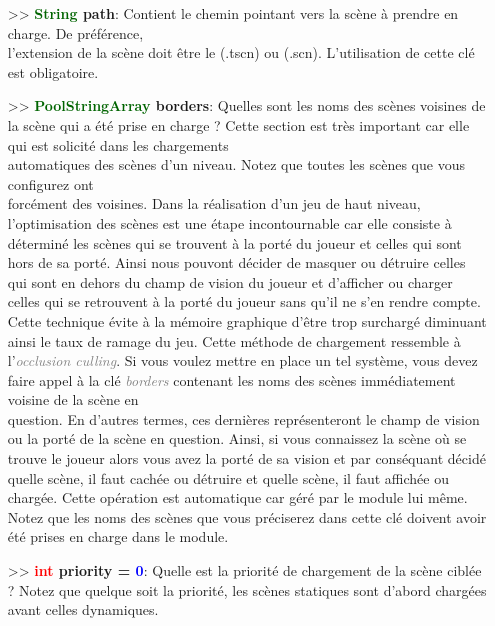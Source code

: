 \documentclass[a4paper, 11pt]{article}
\begin{document}
	\begin{itemize}
		\item[>> \textbf{\textcolor{darkgreen}{String} path}:] Contient le chemin pointant vers la scène à 
		prendre en charge. De préférence, \\l'extension de la scène doit être le (.tscn) ou (.scn).
		L'utilisation de cette clé est obligatoire.\\
		\item[>> \textbf{\textcolor{darkgreen}{PoolStringArray} borders}:] Quelles sont les noms des scènes 
		voisines de la scène qui a été prise en charge ? Cette section est très important car elle qui est 
		solicité dans les chargements \\automatiques des scènes d'un niveau. Notez que toutes les scènes que 
		vous configurez ont \\forcément des voisines. Dans la réalisation d'un jeu de haut niveau, 
		l'optimisation des scènes est une étape incontournable car elle consiste à déterminé les scènes 
		qui se trouvent à la porté du joueur et celles qui sont hors de sa porté. Ainsi nous pouvont décider 
		de masquer ou détruire celles qui sont en dehors du champ de vision du joueur et d'afficher ou 
		charger celles qui se retrouvent à la porté du joueur sans qu'il ne s'en rendre compte. Cette 
		technique évite à la mémoire graphique d'être trop surchargé diminuant ainsi le taux de ramage du 
		jeu. Cette méthode de chargement ressemble à l'\textit{\textcolor{gray}{occlusion culling}}. Si vous 
		voulez mettre en place un tel système, vous devez faire appel à la clé \textit{\textcolor{gray}
		{borders}} contenant les noms des scènes immédiatement voisine de la scène en \\question. En 
		d'autres termes, ces dernières représenteront le champ de vision ou la porté de la scène en 
		question. Ainsi, si vous connaissez la scène où se trouve le joueur alors vous avez la porté de sa 
		vision et par conséquant décidé quelle scène, il faut cachée ou détruire et quelle scène, il faut 
		affichée ou chargée. Cette opération est automatique car géré par le module lui même. Notez que les 
		noms des scènes que vous préciserez dans cette clé doivent avoir été prises en charge dans le
		module.\\
		\item[>> \textbf{\textcolor{red}{int} priority = \textcolor{blue}{0}}:] Quelle est la priorité de
		chargement de la scène ciblée ? Notez que quelque soit la priorité, les scènes statiques sont 
		d'abord chargées avant celles dynamiques.\\
	\end{itemize}
\end{document}
